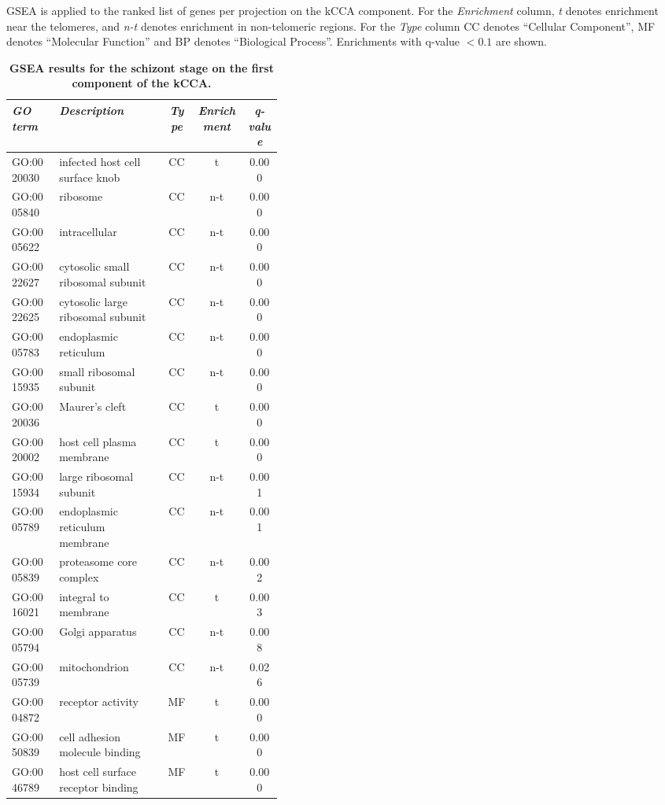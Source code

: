 \begin{table}
\caption{{\bf GSEA results for the schizont stage on the first component of the
kCCA. }}
{\normalsize GSEA is applied to the ranked list of genes per projection on the kCCA
component.
For the \emph{Enrichment} column, \emph{t} denotes enrichment near the
telomeres, and \emph{n-t} denotes enrichment in non-telomeric regions.
For the \emph{Type} column CC denotes ``Cellular Component'',
MF denotes ``Molecular Function'' and BP denotes ``Biological Process''.
Enrichments with q-value $< 0.1$ are shown.}
\vspace{10pt}
\begin{center}
\begin{tabular}{lp{0.4\linewidth}ccc}
\hline
\emph{GO term }&  \emph{Description} & \emph{Type} & \emph{Enrichment} &  \emph{q-value}  \\
\hline
GO:0020030 & infected host cell surface knob & CC & t & 0.000\\
GO:0005840 & ribosome & CC & n-t  & 0.000\\
GO:0005622 & intracellular & CC & n-t  & 0.000\\
GO:0022627 & cytosolic small ribosomal subunit & CC & n-t  & 0.000\\
GO:0022625 & cytosolic large ribosomal subunit & CC & n-t  & 0.000\\
GO:0005783 & endoplasmic reticulum & CC & n-t  & 0.000\\
GO:0015935 & small ribosomal subunit & CC & n-t  & 0.000\\
GO:0020036 & Maurer's cleft & CC & t & 0.000\\
GO:0020002 & host cell plasma membrane & CC & t & 0.000\\
GO:0015934 & large ribosomal subunit & CC & n-t  & 0.001\\
GO:0005789 & endoplasmic reticulum membrane & CC & n-t  & 0.001\\
GO:0005839 & proteasome core complex & CC & n-t  & 0.002\\
GO:0016021 & integral to membrane & CC & t & 0.003\\
GO:0005794 & Golgi apparatus & CC & n-t  & 0.008\\
GO:0005739 & mitochondrion & CC & n-t  & 0.026\\
GO:0004872 & receptor activity & MF  & t  & 0.000\\
GO:0050839 & cell adhesion molecule binding & MF  & t & 0.000\\
GO:0046789 & host cell surface receptor binding & MF  & t & 0.000\\

\end{tabular}
\end{center}
\end{table}
